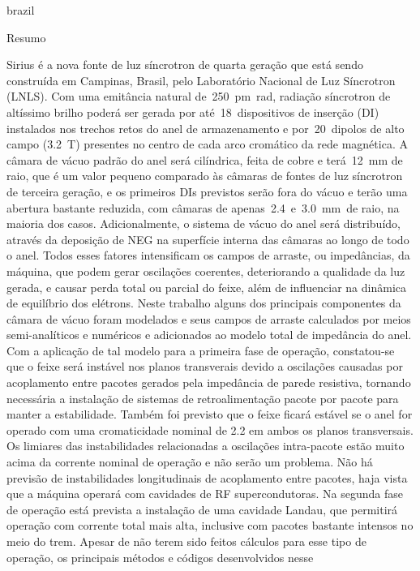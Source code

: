 
\begin{otherlanguage*}{brazil}
    \begin{center}{\ABNTEXchapterfont\huge Resumo}\end{center}
    Sirius é a nova fonte de luz síncrotron de quarta geração que está sendo construída em Campinas, Brasil, pelo Laboratório Nacional de Luz Síncrotron (LNLS). Com uma emitância natural de~\SI{250}{\pico\meter\radian}, radiação síncrotron de altíssimo brilho poderá ser gerada por até~\num{18}~dispositivos de inserção (DI) instalados nos trechos retos do anel de armazenamento e por~\si{20}~dipolos de alto campo (\SI{3.2}{\tesla}) presentes no centro de cada arco cromático da rede magnética. A câmara de vácuo padrão do anel será cilíndrica, feita de cobre e terá~\SI{12}{\milli\meter} de raio, que é um valor pequeno comparado às câmaras de fontes de luz síncrotron de terceira geração, e os primeiros DIs previstos serão fora do vácuo e terão uma abertura bastante reduzida, com câmaras de apenas~\num{2.4}~e~\SI{3.0}{\milli\meter}~de raio, na maioria dos casos. Adicionalmente, o sistema de vácuo do anel será distribuído, através da deposição de NEG na superfície interna das câmaras ao longo de todo o anel. Todos esses fatores intensificam os campos de arraste, ou impedâncias, da máquina, que podem gerar oscilações coerentes, deteriorando a qualidade da luz gerada, e causar perda total ou parcial do feixe, além de influenciar na dinâmica de equilíbrio dos elétrons. Neste trabalho alguns dos principais componentes da câmara de vácuo foram modelados e seus campos de arraste calculados por meios semi-analíticos e numéricos e adicionados ao modelo total de impedância do anel. Com a aplicação de tal modelo para a primeira fase de operação, constatou-se que o feixe será instável nos planos transverais devido a oscilações causadas por acoplamento entre pacotes gerados pela impedância de parede resistiva, tornando necessária a instalação de sistemas de retroalimentação pacote por pacote para manter a estabilidade. Também foi previsto que o feixe ficará estável se o anel for operado com uma cromaticidade nominal de \num{2.2} em ambos os planos transversais. Os limiares das instabilidades relacionadas a oscilações intra-pacote estão muito acima da corrente nominal de operação e não serão um problema. Não há previsão de instabilidades longitudinais de acoplamento entre pacotes, haja vista que a máquina operará com cavidades de RF supercondutoras. Na segunda fase de operação está prevista a instalação de uma cavidade Landau, que permitirá operação com corrente total mais alta, inclusive com pacotes bastante intensos no meio do trem. Apesar de não terem sido feitos cálculos para esse tipo de operação, os principais métodos e códigos desenvolvidos nesse 
\end{otherlanguage*}
